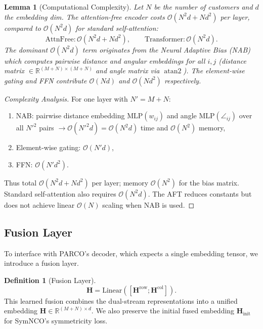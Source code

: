 \documentclass[journal,twoside,web]{ieeecolor}
\newtheorem{lemma}[theorem]{Lemma}
\theoremstyle{definition}
\newtheorem{definition}[theorem]{Definition}
\theoremstyle{remark}
\theoremstyle{definition}
\begin{document}
\begin{lemma}[Computational Complexity]
Let $N$ be the number of customers and $d$ the embedding dim.
The attention-free encoder costs $\mathcal{O}(N^2 d + N d^2)$ per layer, compared to $\mathcal{O}(N^2 d)$ for standard self-attention:
\begin{equation}
\text{AttnFree}: \mathcal{O}(N^2 d + N d^2),
\qquad
\text{Transformer}: \mathcal{O}(N^2 d).
\end{equation}
The dominant $\mathcal{O}(N^2 d)$ term originates from the Neural Adaptive Bias (NAB) which computes pairwise distance and angular embeddings for all $i,j$ (distance matrix $\in\mathbb{R}^{(M+N)\times(M+N)}$ and angle matrix via $\operatorname{atan2}$). The element-wise gating and FFN contribute $\mathcal{O}(Nd)$ and $\mathcal{O}(Nd^2)$ respectively.
\end{lemma}

\begin{proof}[Complexity Analysis]
For one layer with $N' = M+N$:
\begin{enumerate}
    \item NAB: pairwise distance embedding $\text{MLP}(w_{ij})$ and angle $\text{MLP}(\angle_{ij})$ over all $N'^2$ pairs $\to \mathcal{O}(N'^2 d)=\mathcal{O}(N^2 d)$ time and $\mathcal{O}(N^2)$ memory,
    \item Element-wise gating: $\mathcal{O}(N' d)$,
    \item FFN: $\mathcal{O}(N' d^2)$.
\end{enumerate}
Thus total $\mathcal{O}(N^2 d + N d^2)$ per layer; memory $\mathcal{O}(N^2)$ for the bias matrix. Standard self-attention also requires $\mathcal{O}(N^2 d)$. The AFT reduces constants but does not achieve linear $\mathcal{O}(N)$ scaling when NAB is used.
\end{proof}

\subsection{Fusion Layer}
To interface with PARCO's decoder, which expects a single embedding tensor, we introduce a fusion layer.

\begin{definition}[Fusion Layer]
\begin{equation}
\mathbf{H} = \text{Linear}([\mathbf{H}^{\text{row}}; \mathbf{H}^{\text{col}}]).
\end{equation}
This learned fusion combines the dual-stream representations into a unified embedding $\mathbf{H} \in \mathbb{R}^{(M+N) \times d}$. We also preserve the initial fused embedding $\mathbf{H}_{\text{init}}$ for SymNCO's symmetricity loss.
\end{definition}
\end{document}
